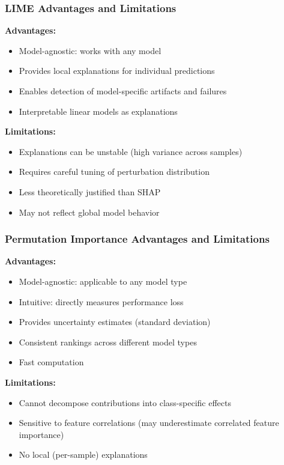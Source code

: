 \documentclass[journal]{IEEEtran}
\begin{document}
\subsubsection{LIME Advantages and Limitations}

\textbf{Advantages:}
\begin{itemize}
    \item Model-agnostic: works with any model
    \item Provides local explanations for individual predictions
    \item Enables detection of model-specific artifacts and failures
    \item Interpretable linear models as explanations
\end{itemize}

\textbf{Limitations:}
\begin{itemize}
    \item Explanations can be unstable (high variance across samples)
    \item Requires careful tuning of perturbation distribution
    \item Less theoretically justified than SHAP
    \item May not reflect global model behavior
\end{itemize}

\subsubsection{Permutation Importance Advantages and Limitations}

\textbf{Advantages:}
\begin{itemize}
    \item Model-agnostic: applicable to any model type
    \item Intuitive: directly measures performance loss
    \item Provides uncertainty estimates (standard deviation)
    \item Consistent rankings across different model types
    \item Fast computation
\end{itemize}

\textbf{Limitations:}
\begin{itemize}
    \item Cannot decompose contributions into class-specific effects
    \item Sensitive to feature correlations (may underestimate correlated feature importance)
    \item No local (per-sample) explanations
\end{itemize}
\end{document}
